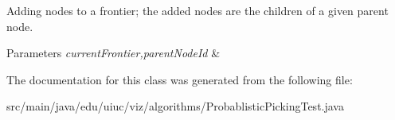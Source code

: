 Adding nodes to a frontier; the added nodes are the children of a given parent node.


\begin{DoxyParams}{Parameters}
{\em current\+Frontier,parent\+Node\+Id} & \\
\hline
\end{DoxyParams}


The documentation for this class was generated from the following file\+:\begin{DoxyCompactItemize}
\item 
src/main/java/edu/uiuc/viz/algorithms/Probablistic\+Picking\+Test.\+java\end{DoxyCompactItemize}
